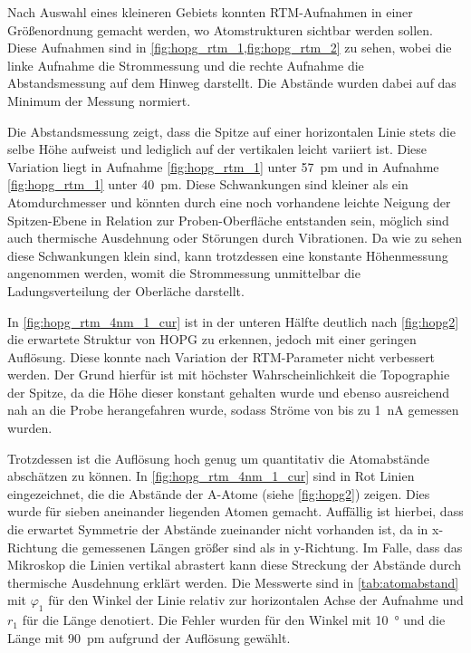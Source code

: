 Nach Auswahl eines kleineren Gebiets konnten RTM-Aufnahmen in einer Größenordnung gemacht werden, wo 
Atomstrukturen sichtbar werden sollen. Diese Aufnahmen sind in \cref{fig:hopg_rtm_1,fig:hopg_rtm_2} zu sehen, wobei 
die linke Aufnahme die Strommessung und die rechte Aufnahme die Abstandsmessung auf dem Hinweg darstellt.
Die Abstände wurden dabei auf das Minimum der Messung normiert.\par
Die Abstandsmessung zeigt, dass die 
Spitze auf einer horizontalen Linie stets die selbe Höhe aufweist und lediglich auf der vertikalen leicht variiert ist.
Diese Variation liegt in Aufnahme \ref{fig:hopg_rtm_1} unter \SI{57}{\pm} und in Aufnahme \ref{fig:hopg_rtm_1}
unter \SI{40}{\pm}. Diese Schwankungen sind kleiner als ein Atomdurchmesser und könnten durch eine noch 
vorhandene leichte Neigung der Spitzen-Ebene in Relation zur Proben-Oberfläche entstanden sein, möglich sind auch 
thermische Ausdehnung oder Störungen durch Vibrationen. Da wie zu sehen diese Schwankungen klein sind, kann 
trotzdessen eine konstante Höhenmessung angenommen werden, womit die Strommessung unmittelbar die 
Ladungsverteilung der Oberläche darstellt.




In \cref{fig:hopg_rtm_4nm_1_cur} ist in der unteren Hälfte deutlich nach \cref{fig:hopg2} die erwartete Struktur 
von HOPG zu erkennen, jedoch mit einer geringen Auflösung. Diese konnte nach Variation der 
RTM-Parameter nicht verbessert werden. Der Grund hierfür ist mit höchster Wahrscheinlichkeit die Topographie 
der Spitze, da die Höhe dieser konstant gehalten wurde und ebenso ausreichend nah an die Probe 
herangefahren wurde, sodass Ströme von bis zu \SI{1}{\nano\ampere} gemessen wurden.\par
Trotzdessen ist die Auflösung hoch genug um quantitativ die Atomabstände abschätzen zu können.
In \cref{fig:hopg_rtm_4nm_1_cur} sind in Rot Linien eingezeichnet, die die Abstände der A-Atome (siehe 
\cref{fig:hopg2}) zeigen. Dies wurde für sieben aneinander liegenden Atomen gemacht. Auffällig ist
hierbei, dass die erwartet Symmetrie der Abstände zueinander nicht vorhanden ist, da in 
x-Richtung die gemessenen Längen größer sind als in y-Richtung. Im Falle, dass das Mikroskop 
die Linien vertikal abrastert kann diese Streckung der Abstände durch thermische Ausdehnung 
erklärt werden. Die Messwerte sind in \cref{tab:atomabstand} mit $\varphi_1$ für den Winkel der 
Linie relativ zur horizontalen Achse der Aufnahme und $r_1$ für die Länge denotiert. Die 
Fehler wurden für den Winkel mit \SI{10}{\degree} und die Länge mit \SI{90}{\pm} aufgrund 
der Auflösung gewählt.\par


